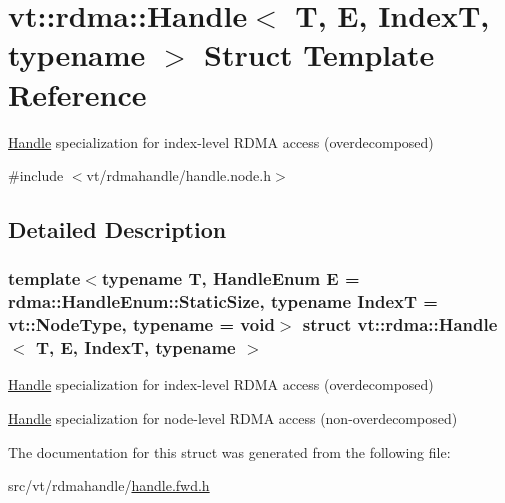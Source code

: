\hypertarget{structvt_1_1rdma_1_1_handle}{}\section{vt\+:\+:rdma\+:\+:Handle$<$ T, E, IndexT, typename $>$ Struct Template Reference}
\label{structvt_1_1rdma_1_1_handle}


\hyperlink{structvt_1_1rdma_1_1_handle}{Handle} specialization for index-\/level R\+D\+MA access (overdecomposed)  




{\ttfamily \#include $<$vt/rdmahandle/handle.\+node.\+h$>$}



\subsection{Detailed Description}
\subsubsection*{template$<$typename T, Handle\+Enum E = rdma\+::\+Handle\+Enum\+::\+Static\+Size, typename IndexT = vt\+::\+Node\+Type, typename = void$>$\newline
struct vt\+::rdma\+::\+Handle$<$ T, E, Index\+T, typename $>$}

\hyperlink{structvt_1_1rdma_1_1_handle}{Handle} specialization for index-\/level R\+D\+MA access (overdecomposed) 

\hyperlink{structvt_1_1rdma_1_1_handle}{Handle} specialization for node-\/level R\+D\+MA access (non-\/overdecomposed) 

The documentation for this struct was generated from the following file\+:\begin{DoxyCompactItemize}
\item 
src/vt/rdmahandle/\hyperlink{handle_8fwd_8h}{handle.\+fwd.\+h}\end{DoxyCompactItemize}
